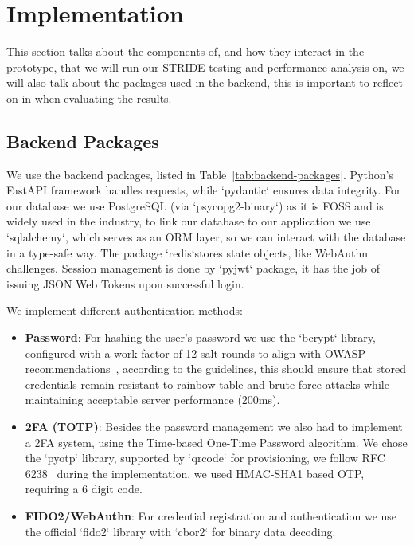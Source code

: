 \section{Implementation}\label{sec:implementation}
This section talks about the components of, and how they interact in the prototype, that we will run our STRIDE testing and performance analysis on, we will also talk about the packages used in the backend, this is important to reflect on in when evaluating the results. 

\subsection{Backend Packages}
We use the backend packages, listed in Table~\ref{tab:backend-packages}. Python's FastAPI framework handles requests, while `pydantic` ensures data integrity. For our database we use PostgreSQL (via `psycopg2-binary`) as it is FOSS and is widely used in the industry, to link our database to our application we use `sqlalchemy`, which serves as an ORM layer, so we can interact with the database in a type-safe way. The package `redis`stores state objects, like WebAuthn challenges. Session management is done by `pyjwt` package, it has the job of issuing JSON Web Tokens upon successful login.

We implement different authentication methods:
\begin{itemize}
    \item \textbf{Password}:  For hashing the user's password we use the `bcrypt` library, configured with a work factor of 12 salt rounds to align with OWASP recommendations~\cite{OWASPPasswordStorage}, according to the guidelines, this should ensure that stored credentials remain resistant to rainbow table and brute-force attacks while maintaining acceptable server performance (200ms).
    \item \textbf{2FA (TOTP)}: Besides the password management we also had to implement a 2FA system, using the Time-based One-Time Password algorithm. We chose the `pyotp` library, supported by `qrcode` for provisioning, we follow RFC 6238~\cite{RFC6238} during the implementation, we used HMAC-SHA1 based OTP, requiring a 6 digit code.
    \item \textbf{FIDO2/WebAuthn}: For credential registration and authentication we use the  official `fido2` library with `cbor2` for binary data decoding.
\end{itemize}

